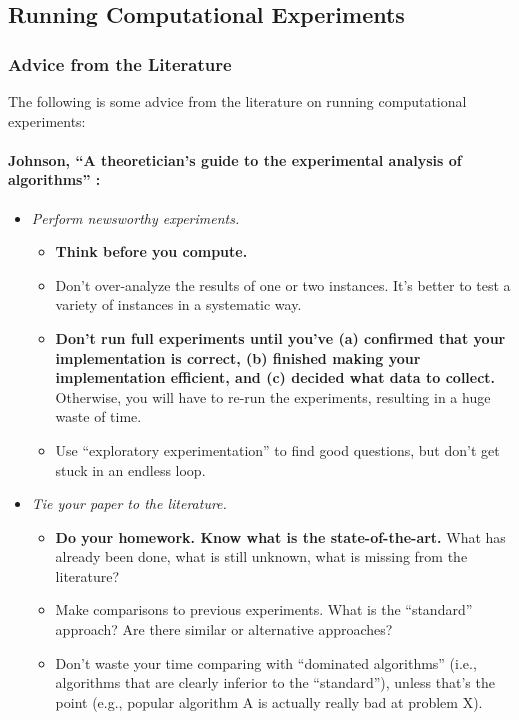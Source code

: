 \documentclass[12pt]{article}
\begin{document}
\subsection{Running Computational Experiments}
\subsubsection{Advice from the Literature}
The following is some advice from the literature on running computational experiments:
\paragraph{Johnson, ``A theoretician's guide to the experimental analysis of algorithms'' \cite{johnson2002theoretician}:}
\begin{itemize}
    \item \emph{Perform newsworthy experiments.}
        \begin{itemize}
            \item \textbf{Think before you compute.}
            \item Don't over-analyze the results of one or two instances. It's better to test a variety of instances in a systematic way.
            \item \textbf{Don't run full experiments until you've (a) confirmed that your implementation is correct, (b) finished making your implementation efficient, and (c) decided what data to collect.} Otherwise, you will have to re-run the experiments, resulting in a huge waste of time.
            \item Use ``exploratory experimentation'' to find good questions, but don't get stuck in an endless loop.
        \end{itemize}
    \item \emph{Tie your paper to the literature.}
        \begin{itemize}
            \item \textbf{Do your homework. Know what is the state-of-the-art.} What has already been done, what is still unknown, what is missing from the literature?
            \item Make comparisons to previous experiments. What is the ``standard'' approach? Are there similar or alternative approaches?
            \item Don't waste your time comparing with ``dominated algorithms'' (i.e., algorithms that are clearly inferior to the ``standard''), unless that's the point (e.g., popular algorithm A is actually really bad at problem X).

\end{itemize}
\end{itemize}
\end{document}
